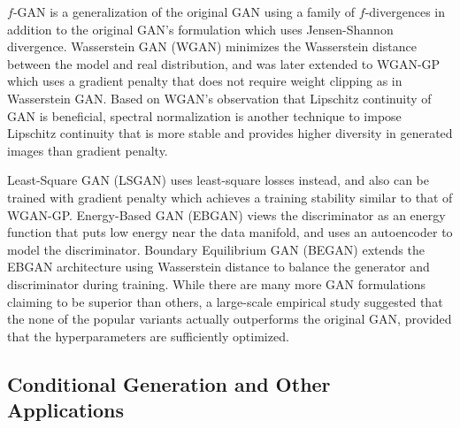 $f$-GAN \cite{nowozin2016fgan} is a generalization of the original GAN using a family of $f$-divergences in addition to the original GAN's formulation which uses Jensen-Shannon divergence.
Wasserstein GAN (WGAN) \cite{arjovsky2017wgan} minimizes the Wasserstein distance between the model and real distribution, and was later extended to WGAN-GP \cite{gulrajani2017wgan} which uses a gradient penalty that does not require weight clipping as in Wasserstein GAN.
Based on WGAN's observation that Lipschitz continuity of GAN is beneficial, spectral normalization \cite{miyato2018spectral} is another technique to impose Lipschitz continuity that is more stable and provides higher diversity in generated images than gradient penalty.

Least-Square GAN (LSGAN) \cite{mao2017lsgan} uses least-square losses instead, and also can be trained with gradient penalty \cite{mao2018effectiveness} which achieves a training stability similar to that of WGAN-GP.
Energy-Based GAN (EBGAN) \cite{zhao2017ebgan} views the discriminator as an energy function that puts low energy near the data manifold, and uses an autoencoder to model the discriminator. Boundary Equilibrium GAN (BEGAN) \cite{berthelot2017began} extends the EBGAN architecture using Wasserstein distance to balance the generator and discriminator during training.
While there are many more GAN formulations claiming to be superior than others, a large-scale empirical study \cite{lucic2017gan} suggested that the none of the popular variants actually outperforms the original GAN, provided that the hyperparameters are sufficiently optimized.


\subsection{Conditional Generation and Other Applications}


